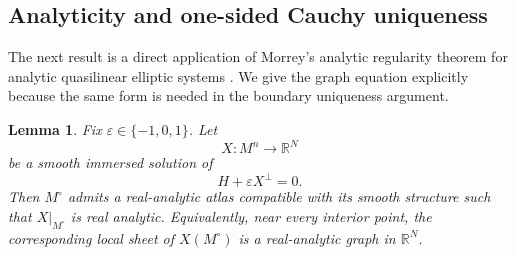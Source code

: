 \documentclass[11pt,a4paper]{article}
\numberwithin{equation}{section}
\newtheorem{lemma}[theorem]{Lemma}
\begin{document}
\subsection{Analyticity and one-sided Cauchy uniqueness}

The next result is a direct application of Morrey's analytic regularity theorem for analytic quasilinear elliptic systems \cite[Chapter~6]{Morrey1966}.  We give the graph equation explicitly because the same form is needed in the boundary uniqueness argument.

\begin{lemma}\label{lem:analyticity}
Fix $\varepsilon\in\{-1,0,1\}$. Let
$$
        X:M^n\longrightarrow\mathbb R^N
$$
be a smooth immersed solution of
$$
        H+\varepsilon X^\perp=0.
$$
Then $M^\circ$ admits a real-analytic atlas compatible with its smooth
structure such that $X|_{M^\circ}$ is real analytic.  Equivalently, near
every interior point, the corresponding local sheet of $X(M^\circ)$ is
a real-analytic graph in $\mathbb R^N$.
\end{lemma}
\end{document}
